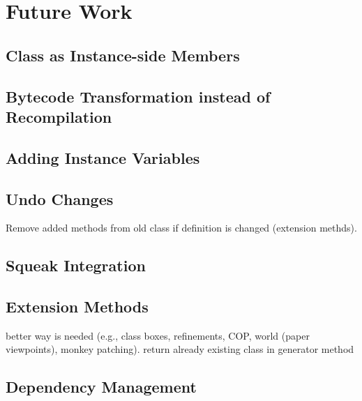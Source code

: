 \chapter{Future Work}
\label{sec:future}

\section{Class as Instance-side Members}
\label{sec:future_inst_side}

\section{Bytecode Transformation instead of Recompilation}

\section{Adding Instance Variables}

\section{Undo Changes}
Remove added methods from old class if definition is changed (extension methds).

\section{Squeak Integration}

\section{Extension Methods}
\label{sec:future_ext_meth}
better way is needed (e.g., class boxes, refinements, COP, world (paper viewpoints), monkey patching). return already existing class in generator method

\section{Dependency Management}
